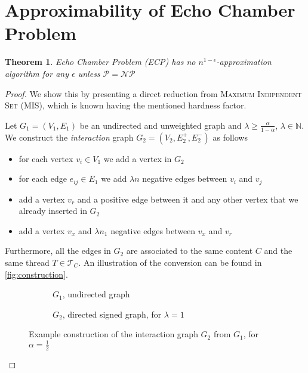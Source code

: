\documentclass{article}
\newtheorem{theorem}{Theorem}
\begin{document}
\section*{Approximability of Echo Chamber Problem}%
\label{sec:approximability_of_echo_chamber_problem}

\begin{theorem}
	\label{th:approximability}
	Echo Chamber Problem (ECP) has no $n^{1-\epsilon} $-approximation algorithm for
	any $\epsilon$ unless $\mathcal{P} = \mathcal{NP}  $
\end{theorem}

\begin{proof}
	We show this by presenting a direct reduction from \textsc{Maximum
		Indipendent Set} (MIS), which is known having the mentioned hardness factor.

	\bigskip
	Let $G_{1}  = (V_{1} ,E_{1} )$ be an undirected and unweighted graph and
	$\lambda \geq \frac{\alpha }{1 - \alpha }$, $\lambda \in \mathbb{N}$.
	We construct the \emph{interaction} graph ${G}_{2}  = (V_{2} , E^{+}_{2} , E
			^{-}_{2} ) $ as follows

	\begin{itemize}
		\item for each vertex $v_{i}  \in V_{1} $ we add a vertex in $G_{2} $
		\item for each edge $e_{ij}  \in
			      E_{1} $ we add $\lambda n$ negative edges between $v_{i} $ and $v_{j} $
		\item add a vertex $v_r$ and a positive edge between it and any other
		      vertex that we already inserted in $G_2$
		\item add a vertex $v_x$ and $\lambda n_{1} $ negative edges between $v_x$
		      and $v_{r} $
	\end{itemize}

	Furthermore, all the edges in $G_{2} $ are associated to the same content
	$C$ and the same thread $T \in \mathcal{T}_{C}  $.
	An illustration of the conversion can be found in \autoref{fig:construction}.

	\begin{figure}[hbt]
		\begin{center}
			\begin{subfigure}[b]{0.4\textwidth}
				\centering
				\caption{$G_{1}$, undirected graph}
				\label{fig:g1_example}
			\end{subfigure}
			\begin{subfigure}[b]{0.4\textwidth}
				\centering
				\caption{$G_{2}$, directed signed graph, for $\lambda = 1$}
				\label{fig:g2_example}
			\end{subfigure}
		\end{center}
		\caption{Example construction of the interaction graph $G_{2} $ from
			$G_{1} $, for $\alpha = \frac{1}{2} $}
		\label{fig:construction}
	\end{figure}


\end{proof}
\end{document}
